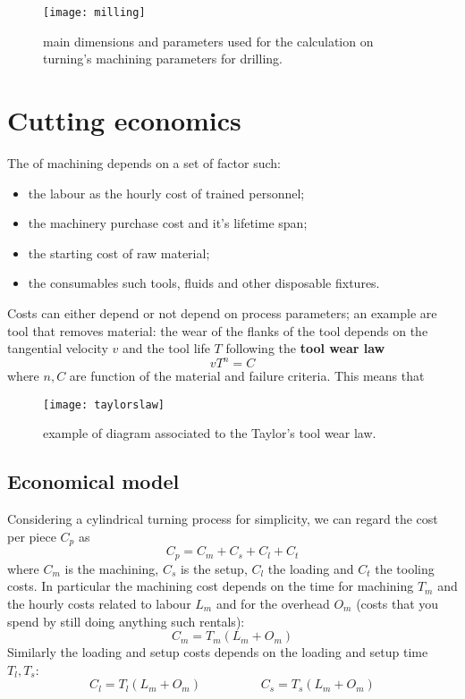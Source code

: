 	
		\begin{SCfigure}[2][bht]
			\centering \texttt{[image: milling]}
			\caption{main dimensions and parameters used for the calculation on turning's machining parameters for drilling.} \label{fig:man:milling}
		\end{SCfigure}

\section{Cutting economics}
	The  of machining depends on a set of factor such:
	\begin{itemize}
		\item the labour as the hourly cost of trained personnel;
		\item the machinery purchase cost and it's lifetime span;
		\item the starting cost of raw material;
		\item the consumables such tools, fluids and other disposable fixtures.
	\end{itemize}
	Costs can either depend or not depend on process parameters; an example are tool that removes material: the wear of the flanks of the tool depends on the tangential velocity $v$  and the tool life $T$ following the  \textbf{tool wear law} 
	\begin{equation}
		v T^n = C
	\end{equation}
	where $n,C$ are function of the material and failure criteria. This means that 
	
	\begin{SCfigure}[2][bht]
		\centering \texttt{[image: taylorslaw]}
		\caption{example of diagram associated to the Taylor's tool wear  law.}
	\end{SCfigure}
	
	\subsection*{Economical model}
		Considering a cylindrical turning process for simplicity, we can regard the cost per piece $C_p$ as
		\[ C_p = C_m + C_s + C_l + C_t \]
		where $C_m$ is the machining, $C_s$ is the setup, $C_l$ the loading and $C_t$ the tooling costs. In particular the machining cost depends on the time for machining $T_m$ and the hourly costs related to labour $L_m$ and for the overhead $O_m$ (costs that you spend by still doing anything such rentals):
		\[ C_m = T_m (L_m + O_m) \]
		Similarly the loading and setup costs depends on the loading and setup time $T_l,T_s$: 
		\[ C_l = T_l  (L_m + O_m)  \hspace{2cm} C_s = T_s  (L_m + O_m)  \]
		

